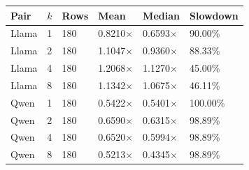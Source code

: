 \begin{tabular}{llllll}
\toprule
Pair & $k$ & Rows & Mean & Median & Slowdown \\
\midrule
Llama & 1 & 180 & 0.8210$\times$ & 0.6593$\times$ & 90.00\% \\
Llama & 2 & 180 & 1.1047$\times$ & 0.9360$\times$ & 88.33\% \\
Llama & 4 & 180 & 1.2068$\times$ & 1.1270$\times$ & 45.00\% \\
Llama & 8 & 180 & 1.1342$\times$ & 1.0675$\times$ & 46.11\% \\
Qwen & 1 & 180 & 0.5422$\times$ & 0.5401$\times$ & 100.00\% \\
Qwen & 2 & 180 & 0.6590$\times$ & 0.6315$\times$ & 98.89\% \\
Qwen & 4 & 180 & 0.6520$\times$ & 0.5994$\times$ & 98.89\% \\
Qwen & 8 & 180 & 0.5213$\times$ & 0.4345$\times$ & 98.89\% \\
\bottomrule
\end{tabular}
